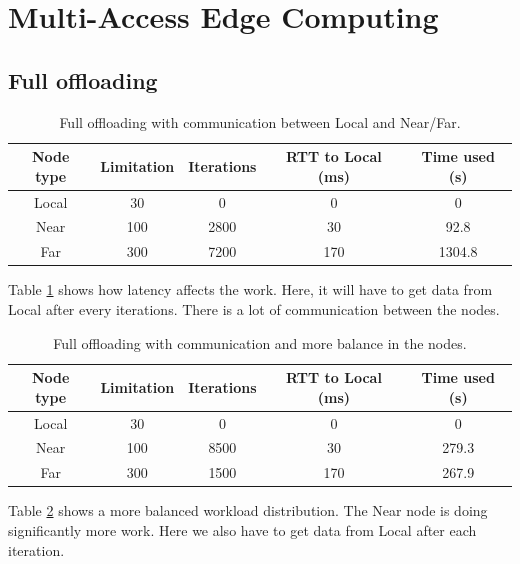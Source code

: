 \section{Multi-Access Edge Computing} \label{section:MEC_evaluation}

\subsection{Full offloading}
\begin{table}[h!]
    \centering
    \begin{tabular}[c]{|c|c|c|c|c|}
        \hline
        Node type & Limitation & Iterations & RTT to Local (ms)& Time used (s)\\
        \hline
        \hline
        Local & 30 & 0 & 0 & 0 \\
        \hline
        Near & 100 & 2800 & 30 & 92.8 \\
        \hline
        Far & 300 & 7200 & 170 & 1304.8 \\
        \hline
    \end{tabular}
    \caption{Full offloading with communication between Local and Near/Far.}
    \label{tab:MEC_full_offloading_latency}
\end{table}

Table \ref{tab:MEC_full_offloading_latency} shows how latency affects the work. Here, it will have to get data from Local after every iterations. There is a lot of communication between the nodes.

\begin{table}[h!]
    \centering
    \begin{tabular}[c]{|c|c|c|c|c|}
        \hline
        Node type & Limitation & Iterations & RTT to Local (ms)& Time used (s)\\
        \hline
        \hline
        Local & 30 & 0 & 0 & 0 \\
        \hline
        Near & 100 & 8500 & 30 & 279.3 \\
        \hline
        Far & 300 & 1500 & 170 & 267.9 \\
        \hline
    \end{tabular}
    \caption{Full offloading with communication and more balance in the nodes.}
    \label{tab:MEC_full_offloading_latency_balance}
\end{table}

Table \ref{tab:MEC_full_offloading_latency_balance} shows a more balanced workload distribution. The Near node is doing significantly more work. Here we also have to get data from Local after each iteration.














